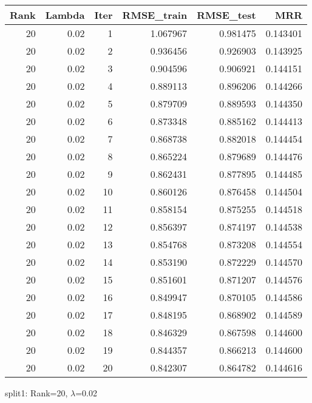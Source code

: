 \begin{tabular}{rrrrrr}
\toprule
 Rank &  Lambda &  Iter &  RMSE\_train &  RMSE\_test &       MRR \\
\midrule
   20 &    0.02 &     1 &    1.067967 &   0.981475 &  0.143401 \\
   20 &    0.02 &     2 &    0.936456 &   0.926903 &  0.143925 \\
   20 &    0.02 &     3 &    0.904596 &   0.906921 &  0.144151 \\
   20 &    0.02 &     4 &    0.889113 &   0.896206 &  0.144266 \\
   20 &    0.02 &     5 &    0.879709 &   0.889593 &  0.144350 \\
   20 &    0.02 &     6 &    0.873348 &   0.885162 &  0.144413 \\
   20 &    0.02 &     7 &    0.868738 &   0.882018 &  0.144454 \\
   20 &    0.02 &     8 &    0.865224 &   0.879689 &  0.144476 \\
   20 &    0.02 &     9 &    0.862431 &   0.877895 &  0.144485 \\
   20 &    0.02 &    10 &    0.860126 &   0.876458 &  0.144504 \\
   20 &    0.02 &    11 &    0.858154 &   0.875255 &  0.144518 \\
   20 &    0.02 &    12 &    0.856397 &   0.874197 &  0.144538 \\
   20 &    0.02 &    13 &    0.854768 &   0.873208 &  0.144554 \\
   20 &    0.02 &    14 &    0.853190 &   0.872229 &  0.144570 \\
   20 &    0.02 &    15 &    0.851601 &   0.871207 &  0.144576 \\
   20 &    0.02 &    16 &    0.849947 &   0.870105 &  0.144586 \\
   20 &    0.02 &    17 &    0.848195 &   0.868902 &  0.144589 \\
   20 &    0.02 &    18 &    0.846329 &   0.867598 &  0.144600 \\
   20 &    0.02 &    19 &    0.844357 &   0.866213 &  0.144600 \\
   20 &    0.02 &    20 &    0.842307 &   0.864782 &  0.144616 \\
\bottomrule
\end{tabular}

\caption{split1: Rank=20, $\lambda$=0.02}
